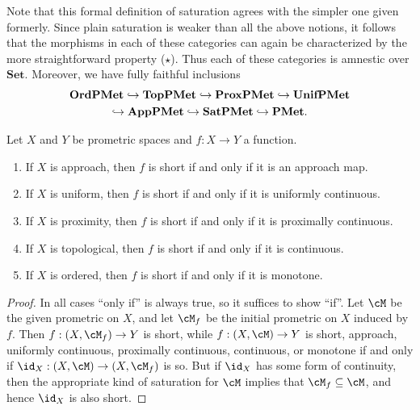\documentclass{article}
\def\Set{\mathbf{Set}}
\def\PMet{\mathbf{PMet}}
\def\TopPMet{\mathbf{TopPMet}}
\def\UnifPMet{\mathbf{UnifPMet}}
\def\ProxPMet{\mathbf{ProxPMet}}
\def\AppPMet{\mathbf{AppPMet}}
\def\OrdPMet{\mathbf{OrdPMet}}
\def\SatPMet{\mathbf{SatPMet}}
\begin{document}
Note that this formal definition of saturation agrees with the simpler one given formerly.
Since plain saturation is weaker than all the above notions, it follows that the morphisms in each of these categories can again be characterized by the more straightforward property ($\star$).
Thus each of these categories is amnestic over $\Set$.
Moreover, we have fully faithful inclusions
\begin{multline*}
  \OrdPMet \into \TopPMet \into \ProxPMet \into \UnifPMet\\
  \into \AppPMet \into \SatPMet \into \PMet.
\end{multline*}

\begin{thm}
  Let $X$ and $Y$ be prometric spaces and $f:X\to Y$ a function.
  \begin{enumerate}
  \item If $X$ is approach, then $f$ is short if and only if it is an approach map.
  \item If $X$ is uniform, then $f$ is short if and only if it is uniformly continuous.
  \item If $X$ is proximity, then $f$ is short if and only if it is proximally continuous.
  \item If $X$ is topological, then $f$ is short if and only if it is continuous.
  \item If $X$ is ordered, then $f$ is short if and only if it is monotone.
  \end{enumerate}
\end{thm}
\begin{proof}
  In all cases ``only if'' is always true, so it suffices to show ``if''.
  Let $\cM$ be the given prometric on $X$, and let $\cM_f$ be the initial prometric on $X$ induced by $f$.
  Then $f:(X,\cM_f) \to Y$ is short, while $f:(X,\cM) \to Y$ is short, approach, uniformly continuous, proximally continuous, continuous, or monotone if and only if $\id_X:(X,\cM) \to (X,\cM_f)$ is so.
  But if $\id_X$ has some form of continuity, then the appropriate kind of saturation for $\cM$ implies that $\cM_f \subseteq \cM$, and hence $\id_X$ is also short.
\end{proof}
\end{document}
